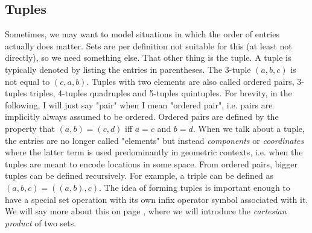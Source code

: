 \subsection{Tuples}
Sometimes, we may want to model situations in which the order of entries actually does matter. Sets are per definition not suitable for this (at least not directly), so we need something else. That other thing is the tuple. A tuple is typically denoted by listing the entries in parentheses. The 3-tuple $(a,b,c)$ is not equal to $(c,a,b)$. Tuples with two elements are also called ordered pairs, 3-tuples triples, 4-tuples quadruples and 5-tuples quintuples. For brevity, in the following, I will just say "pair" when I mean "ordered pair", i.e. pairs are implicitly always assumed to be ordered. Ordered pairs are defined by the property that $(a,b) = (c,d)$ iff $a = c$ and $b = d$. When we talk about a tuple, the entries are no longer called "elements" but instead \emph{components} or \emph{coordinates} where the latter term is used predominantly in geometric contexts, i.e. when the tuples are meant to encode locations in some space. From ordered pairs, bigger tuples can be defined recursively. For example, a triple can be defined as $(a,b,c) = ((a,b),c)$. The idea of forming tuples is important enough to have a special set operation with its own infix operator symbol associated with it. We will say more about this on page \pageref{Par:SetAlgebra}, where we will introduce the \emph{cartesian product} of two sets.

% 

